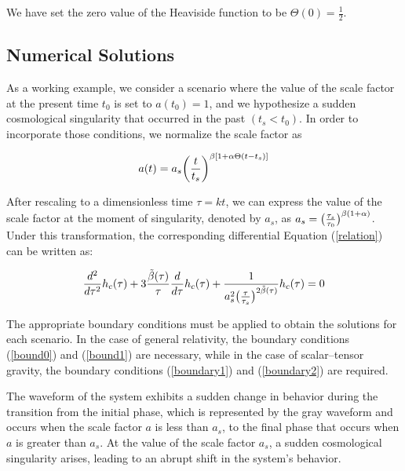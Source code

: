 \documentclass[universe,article,accept,moreauthors,pdftex]{Definitions/mdpi}
\begin{document}
We have set the zero value of the Heaviside function to be $\Theta(0)=\frac{1}{2}$.  

\subsection{Numerical Solutions}
As a working example, we consider a scenario where the value of the scale factor at the present time $t_0$ is set to $a(t_{0})=1$, and we hypothesize a sudden cosmological singularity that occurred in the past $(t_{s}<t_{0})$. In order to incorporate those conditions, we normalize the scale factor as

\begin{equation}\label{scale}
    a(t)=a_{s} \bigg{(}\frac{t}{t_{s}}\bigg{)}^{\beta [1+\alpha\Theta(t-t_{s})]}
\end{equation}






After rescaling to a dimensionless time $\tau=kt$, we can express the value of the scale factor at the moment of singularity, denoted by $a_s$, as $a_{s}=\big{(}\frac{\tau_{s}}{\tau_{0}}\big{)}^{\beta(1+\alpha)}$. Under this transformation, the corresponding differential Equation (\ref{relation}) can be written as:

\begin{equation}\label{diffeq1}
\frac{d^2}{d\tau^2}h_{c}(\tau)+ 3 \frac{\tilde{\beta}(\tau)}{\tau}\frac{d}{d\tau}h_{c}(\tau)+\frac{1}{a^{2}_{s}\big{(}\frac{\tau}{\tau_{s}}\big{)}^{2\tilde{\beta}(\tau)}}h_{c}(\tau)=0
\end{equation}

The appropriate boundary conditions must be applied to obtain the solutions for each scenario. In the case of general relativity, the boundary conditions (\ref{bound0}) and (\ref{bound1}) are necessary, while in the case of scalar--tensor gravity, the boundary conditions (\ref{boundary1}) and (\ref{boundary2}) are required.  

The waveform of the system exhibits a sudden change in behavior during the transition from the initial phase, which is represented by the gray waveform and occurs when the scale factor $a$ is less than $a_s$, to  the final phase that occurs when $a$ is greater than $a_s$. At the value of the scale factor $a_s$, a sudden cosmological singularity arises, leading to an abrupt shift in the system's behavior. 
\end{document}
